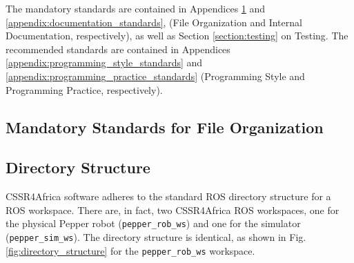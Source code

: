 \documentclass{CSSRforAfrica}
\begin{document}
The mandatory standards are contained in Appendices \ref{appendix:file_standards} and
\ref{appendix:documentation_standards}, 
(File Organization and Internal Documentation, respectively), as well as Section \ref{section:testing} on Testing.
The recommended standards are contained in Appendices \ref{appendix:programming_style_standards}  and
\ref{appendix:programming_practice_standards}    (Programming Style and Programming Practice, respectively).

\pagebreak


\begin{appendices}

\section{Mandatory Standards for  File Organization}
\label{appendix:file_standards}  




\subsection{Directory Structure}
\label{section:directory_structure}

CSSR4Africa software adheres to the standard ROS directory structure for a ROS workspace.
There are, in fact, two CSSR4Africa ROS workspaces, one for the physical Pepper robot ({\small \verb+pepper_rob_ws+}) and one for the simulator ({\small \verb+pepper_sim_ws+}).  The directory structure is identical, as shown in Fig. \ref{fig:directory_structure} for the {\small \verb+pepper_rob_ws+} workspace. 

\begin{figure}[th]
\begin{multicols}{3}

~~~~~~~~~~~~~~~~~~~~~

\vspace{20cm}

\columnbreak

{\small 
{}
}



\end{multicols}
\end{figure}
\end{appendices}
\end{document}
